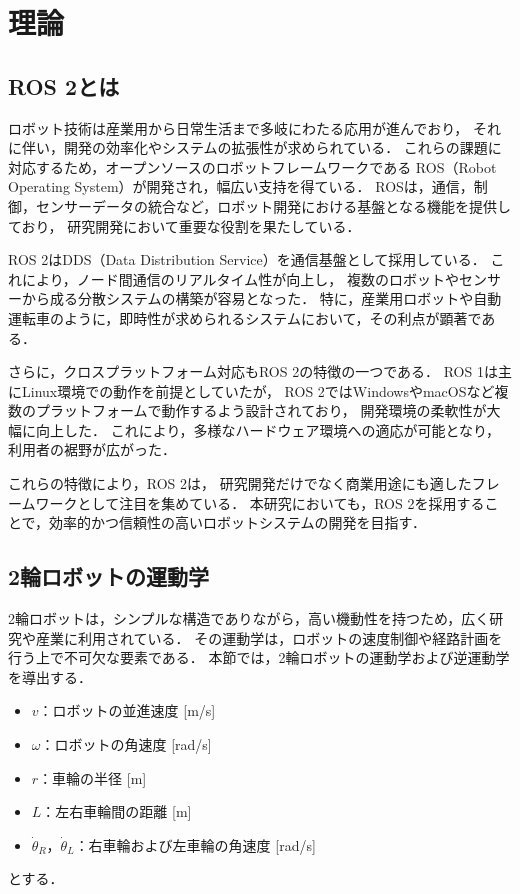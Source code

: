 \section{理論}
\subsection{ROS 2とは}
ロボット技術は産業用から日常生活まで多岐にわたる応用が進んでおり，
それに伴い，開発の効率化やシステムの拡張性が求められている．
これらの課題に対応するため，オープンソースのロボットフレームワークである
ROS（Robot Operating System）が開発され，幅広い支持を得ている．
ROSは，通信，制御，センサーデータの統合など，ロボット開発における基盤となる機能を提供しており，
研究開発において重要な役割を果たしている．

ROS 2はDDS（Data Distribution Service）を通信基盤として採用している．
これにより，ノード間通信のリアルタイム性が向上し，
複数のロボットやセンサーから成る分散システムの構築が容易となった\cite{ros2design}．
特に，産業用ロボットや自動運転車のように，即時性が求められるシステムにおいて，その利点が顕著である．

さらに，クロスプラットフォーム対応もROS 2の特徴の一つである．
ROS 1は主にLinux環境での動作を前提としていたが，
ROS 2ではWindowsやmacOSなど複数のプラットフォームで動作するよう設計されており，
開発環境の柔軟性が大幅に向上した\cite{ros2docs}．
これにより，多様なハードウェア環境への適応が可能となり，利用者の裾野が広がった．

これらの特徴により，ROS 2は，
研究開発だけでなく商業用途にも適したフレームワークとして注目を集めている．
本研究においても，ROS 2を採用することで，効率的かつ信頼性の高いロボットシステムの開発を目指す．

\subsection{2輪ロボットの運動学}
2輪ロボットは，シンプルな構造でありながら，高い機動性を持つため，広く研究や産業に利用されている．
その運動学は，ロボットの速度制御や経路計画を行う上で不可欠な要素である．
本節では，2輪ロボットの運動学および逆運動学を導出する．

\begin{itemize}
    \item $v$：ロボットの並進速度 [m/s]
    \item $\omega$：ロボットの角速度 [rad/s]
    \item $r$：車輪の半径 [m]
    \item $L$：左右車輪間の距離 [m]
    \item $\dot{\theta}_R$，$\dot{\theta}_L$：右車輪および左車輪の角速度 [rad/s]
\end{itemize}
とする．

